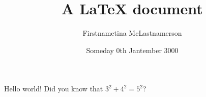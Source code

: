 \documentclass[11pt]{article}
\title{A \LaTeX{} document}
\author{Firstnametina McLastnamerson}
\date{Someday 0th Jantember 3000}
\theoremstyle{definition}
\begin{document}
\maketitle


Hello world! Did you know that $3^2 + 4^2 = 5^2$?

\end{document}
